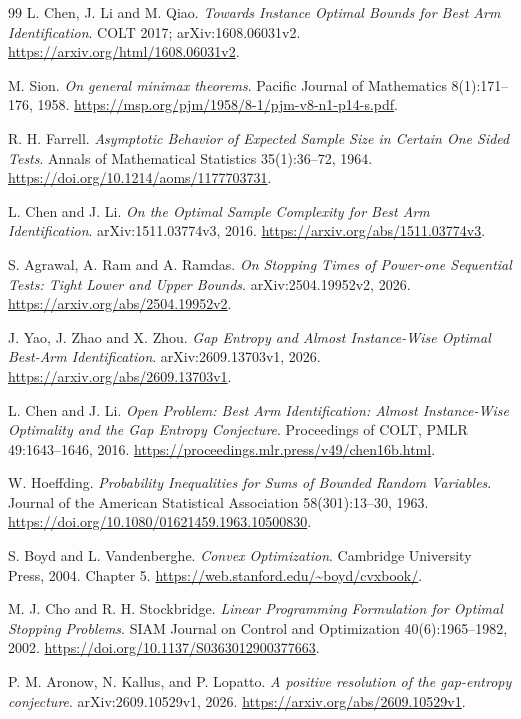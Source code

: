 \begin{thebibliography}{99}
 L. Chen, J. Li and M. Qiao.
\emph{Towards Instance Optimal Bounds for Best Arm Identification}.
COLT 2017; arXiv:1608.06031v2.
\url{https://arxiv.org/html/1608.06031v2}.

 M. Sion.
\emph{On general minimax theorems}.
Pacific Journal of Mathematics 8(1):171--176, 1958.
\url{https://msp.org/pjm/1958/8-1/pjm-v8-n1-p14-s.pdf}.

 R. H. Farrell.
\emph{Asymptotic Behavior of Expected Sample Size in Certain One Sided Tests}.
Annals of Mathematical Statistics 35(1):36--72, 1964.
\url{https://doi.org/10.1214/aoms/1177703731}.

 L. Chen and J. Li.
\emph{On the Optimal Sample Complexity for Best Arm Identification}.
arXiv:1511.03774v3, 2016.
\url{https://arxiv.org/abs/1511.03774v3}.

 S. Agrawal, A. Ram and A. Ramdas.
\emph{On Stopping Times of Power-one Sequential Tests: Tight Lower and Upper Bounds}.
arXiv:2504.19952v2, 2026.
\url{https://arxiv.org/abs/2504.19952v2}.

 J. Yao, J. Zhao and X. Zhou.
\emph{Gap Entropy and Almost Instance-Wise Optimal Best-Arm Identification}.
arXiv:2609.13703v1, 2026.
\url{https://arxiv.org/abs/2609.13703v1}.

L. Chen and J. Li.
\emph{Open Problem: Best Arm Identification: Almost Instance-Wise
Optimality and the Gap Entropy Conjecture}.
Proceedings of COLT, PMLR 49:1643--1646, 2016.
\url{https://proceedings.mlr.press/v49/chen16b.html}.

W. Hoeffding.
\emph{Probability Inequalities for Sums of Bounded Random Variables}.
Journal of the American Statistical Association 58(301):13--30, 1963.
\url{https://doi.org/10.1080/01621459.1963.10500830}.

S. Boyd and L. Vandenberghe. \emph{Convex Optimization}.
Cambridge University Press, 2004. Chapter 5.
\url{https://web.stanford.edu/~boyd/cvxbook/}.

M. J. Cho and R. H. Stockbridge.
\emph{Linear Programming Formulation for Optimal Stopping Problems}.
SIAM Journal on Control and Optimization 40(6):1965--1982, 2002.
\url{https://doi.org/10.1137/S0363012900377663}.

P. M. Aronow, N. Kallus, and P. Lopatto.
\emph{A positive resolution of the gap-entropy conjecture}.
arXiv:2609.10529v1, 2026.
\url{https://arxiv.org/abs/2609.10529v1}.

\end{thebibliography}
